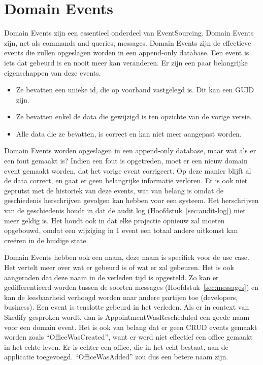 
\section{Domain Events}
\label{sec:domain-events}

Domain Events zijn een essentieel onderdeel van EventSourcing. Domain Events zijn, net als commands and queries, messages. Domain Events zijn de effectieve events die zullen opgeslagen worden in een append-only database. Een event is iets dat gebeurd is en nooit meer kan veranderen. Er zijn een paar belangrijke eigenschappen van deze events.

\begin{itemize}
  \item{Ze bevatten een unieke id, die op voorhand vastgelegd is. Dit kan een \gls{GUID} zijn.}
  \item{Ze bevatten enkel de data die gewijzigd is ten opzichte van de vorige versie.}
  \item{Alle data die ze bevatten, is correct en kan niet meer aangepast worden.}
\end{itemize}

Domain Events worden opgeslagen in een append-only database, maar wat als er een fout gemaakt is? Indien een fout is opgetreden, moet er een nieuw domain event gemaakt worden, dat het vorige event corrigeert. Op deze manier blijft al de data correct, en gaat er geen belangrijke informatie verloren. Er is ook niet geprutst met de historiek van deze events, wat van belang is omdat de geschiedenis herschrijven gevolgen kan hebben voor een systeem. Het herschrijven van de geschiedenis houdt in dat de audit log (Hoofdstuk~\ref{sec:audit-log}) niet meer geldig is. Het houdt ook in dat elke projectie opnieuw zal moeten opgebouwd, omdat een wijziging in 1 event een totaal andere uitkomst kan creëren in de huidige state.

Domain Events hebben ook een naam, deze naam is specifiek voor de use case. Het vertelt meer over wat er gebeurd is of wat er zal gebeuren. Het is ook aangeraden dat deze naam in de verleden tijd is opgesteld. Zo kan er gedifferentieerd worden tussen de soorten messages (Hoofdstuk~\ref{sec:messages}) en kan de leesbaarheid verhoogd worden naar andere partijen toe (developers, business). Een event is tenslotte gebeurd in het verleden. Als er in context van Skedify gesproken wordt, dan is AppointmentWasRescheduled een goede naam voor een domain event. Het is ook van belang dat er geen \gls{CRUD} events gemaakt worden zoals ``OfficeWasCreated'', want er werd niet effectief een office gemaakt in het echte leven. Er is echter een office, die in het echt bestaat, aan de applicatie toegevoegd. ``OfficeWasAdded'' zou dus een betere naam zijn.
